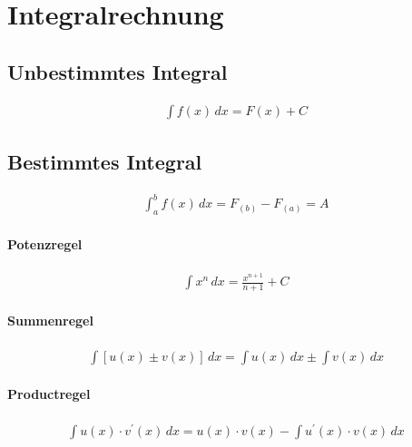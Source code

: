\pagebreak

\section{Integralrechnung}

\subsection{Unbestimmtes Integral}

\begin{align*}
   \int f(x) \,dx = F(x) + C
\end{align*}

\subsection{Bestimmtes Integral}

\begin{align*}
   \int_{a}^{b} f(x) \,dx = F_{(b)} -F_{(a)} = A
\end{align*}


\paragraph{Potenzregel}
\begin{align*}
   \int x^n \,dx = \frac{x^{n+1}}{n+1} + C
\end{align*}
\paragraph{Summenregel}
\begin{align*}
   \int [u(x) \pm v(x)] \,dx = \int u(x) \,dx \pm \int v(x) \,dx
\end{align*}
\paragraph{Productregel}
\begin{align*}
   \int u(x) \cdot v^{\prime}(x) \,dx = u(x) \cdot v(x) - \int u^{\prime}(x) \cdot v(x) \,dx
\end{align*}

